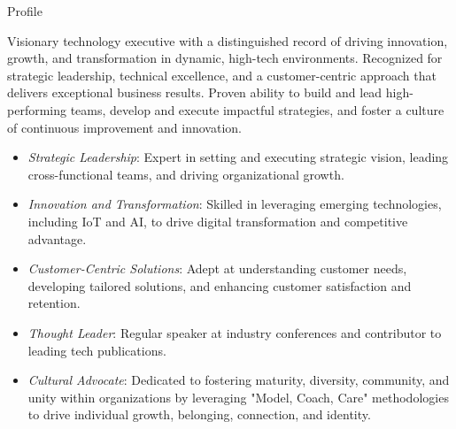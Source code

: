 \documentclass{resume} %
\begin{document}
\vspace{-1em}
\begin{rSection}{Profile}
  
  Visionary technology executive with a distinguished record of driving innovation, growth, and transformation in dynamic, high-tech environments. Recognized for strategic leadership, technical excellence, and a customer-centric approach that delivers exceptional business results. Proven ability to build and lead high-performing teams, develop and execute impactful strategies, and foster a culture of continuous improvement and innovation.

  \begin{itemize}
    \setlength\itemsep{-0.5em}
    \item \textit{Strategic Leadership}: Expert in setting and executing strategic vision, leading cross-functional teams, and driving organizational growth.
    \item \textit{Innovation and Transformation}: Skilled in leveraging emerging technologies, including IoT and AI, to drive digital transformation and competitive advantage.
    \item \textit{Customer-Centric Solutions}: Adept at understanding customer needs, developing tailored solutions, and enhancing customer satisfaction and retention.
    \item \textit{Thought Leader}: Regular speaker at industry conferences and contributor to leading tech publications.
    \item \textit{Cultural Advocate}: Dedicated to fostering maturity, diversity, community, and unity within organizations by leveraging "Model, Coach, Care" methodologies to drive individual growth, belonging, connection, and identity.
  \end{itemize}
  
\end{rSection}



\end{document}
